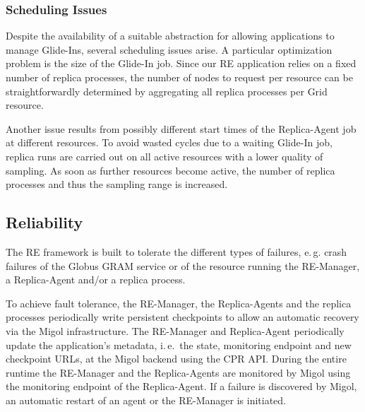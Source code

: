 \documentclass{rspublic}
\newcommand{\jhanote}[1]{ {\textcolor{red} { ***SJ: #1 }}}
\newcommand{\jhanote}[1]{}
\newcommand{\glidein}[1]{Glide-In }
\newcommand{\replicaagent}[1]{Replica-Agent }
\newcommand{\remanager}[1]{RE-Manager }
\begin{document}
\subsubsection{Scheduling Issues}

Despite the availability of a suitable abstraction for allowing applications to manage Glide-Ins, several scheduling issues
arise. A particular optimization problem is the size of the \glidein\ job. Since our 
RE application relies on a fixed number of replica processes, the number of nodes to request per resource can
be straightforwardly determined by aggregating all replica processes per Grid resource.

Another issue results from possibly different start times of the \replicaagent\ job at different resources.
To avoid wasted cycles due to a waiting \glidein\ job, replica runs are carried out on all active resources
with a lower quality of sampling. As soon as further resources become active, the number of replica processes
and thus the sampling range is increased.



                         

\subsection{Reliability}
   
The RE framework is built to tolerate the different types of failures, e.\,g.\:
crash failures of the Globus GRAM service or of the resource
running the RE-Manager, a Replica-Agent and/or a replica process.   
        
To achieve fault tolerance, the RE-Manager, the Replica-Agents and the replica processes
periodically write persistent checkpoints to allow an automatic recovery via the 
Migol infrastructure. The \remanager\ and \replicaagent\ periodically update 
the application's metadata, i.\,e.\ the state, monitoring endpoint and new checkpoint
URLs, at the Migol backend using the CPR API. During the entire runtime the  \remanager\ and the 
Replica-Agents are monitored by Migol using the monitoring endpoint of the
Replica-Agent. If a failure is discovered by Migol, an automatic restart
of an agent or the RE-Manager is initiated.
                         
                           
\end{document}
